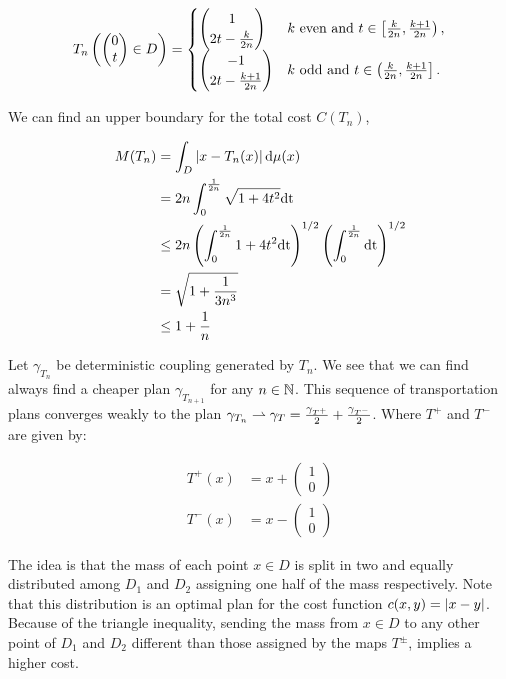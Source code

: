 \begin{equation*}
T_n\left( \begin{pmatrix}0\\t\end{pmatrix}\in D \right)=\begin{cases}
\begin{pmatrix}1\\  2t - \frac{k}{2n}\end{pmatrix} & k \text{ even } \mathrm{and} \ t \in \left[\frac{k}{2n}, \frac{k+1}{2n}\right),  \\
\begin{pmatrix}-1 \\  2t- \frac{k+1}{2n}\end{pmatrix} &  k \text{ odd } \mathrm{and} \ t \in \left(\frac{k}{2n}, \frac{k+1}{2n}\right].
\end{cases}
\end{equation*}

We can find an upper boundary for the total cost $C(T_n)$,

\begin{align*}
M(T_n)&=\int_{D}\left| x-T_n(x) \right| \mathrm{d}\mu(x)\\&=2n\int_{0}^{\frac{1}{2n}}\sqrt{1+4t^2} \mathrm{dt}\\ &\leq 2n\left( \int_{0}^{\frac{1}{2n}}1+4t^2\mathrm{dt} \right)^{1/2}\left( \int_{0}^{\frac{1}{2n}}\mathrm{dt} \right)^{1/2}\\ &= \sqrt{1+\frac{1}{3n^3}}\\&\leq 1+\frac{1}{n}
\end{align*}

Let $\gamma_{T_n}$ be deterministic coupling generated by $T_n$. We see that we can find always find a cheaper plan $\gamma_{T_{n+1}}$ for any $n\in \mathbb{N}$. This sequence of transportation plans converges weakly to the plan $\gamma_{T_n}\rightharpoonup \gamma_{T}=\frac{\gamma_{T^+}}{2}	+ \frac{\gamma_{T^-}}{2}$. Where $T^{+}$ and $T^{-}$ are given by:

\begin{align*}
T^{+}(x)&=x+\begin{pmatrix} 1 \\ 0\end{pmatrix}\\
T^{-}(x)&=x-\begin{pmatrix} 1 \\ 0\end{pmatrix}
\end{align*} 


The idea is that the mass of each point $x\in D$ is split in two and equally distributed among $D_1$ and $D_2$ assigning one half of the mass respectively. Note that this distribution is an optimal plan for the cost function $c(x,y)=\left| x-y \right|$. Because of the triangle inequality, sending the mass from $x\in D$ to any other point of $D_1$ and $D_2$ different than those assigned by the maps $T^{\pm}$, implies a higher cost.


